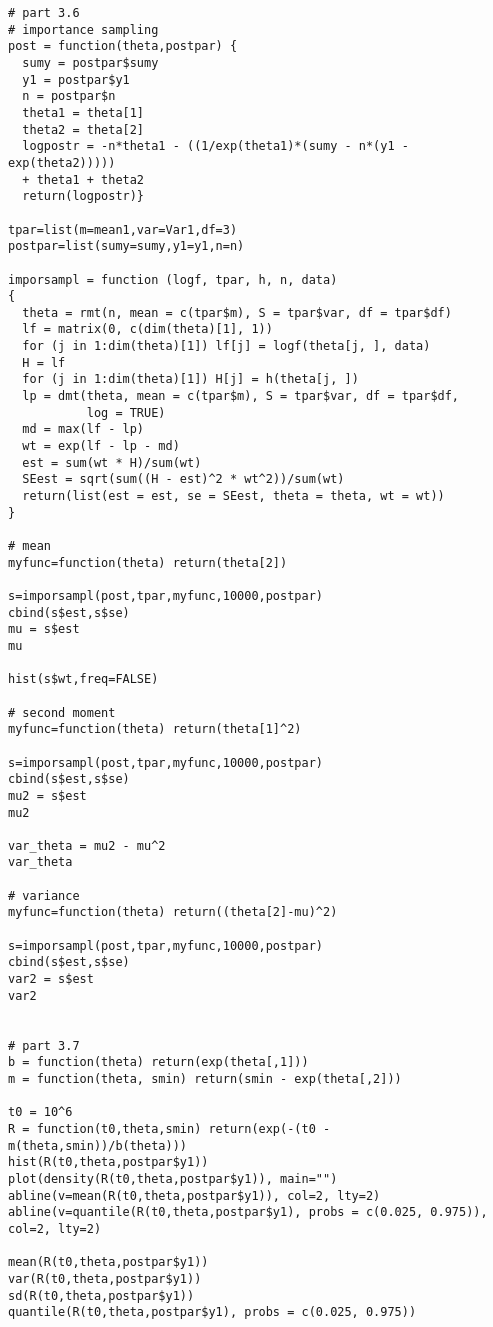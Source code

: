 \documentclass[a4paper, 11pt]{article}
\begin{document}
\begin{verbatim}
# part 3.6
# importance sampling
post = function(theta,postpar) {
  sumy = postpar$sumy
  y1 = postpar$y1
  n = postpar$n
  theta1 = theta[1]
  theta2 = theta[2]
  logpostr = -n*theta1 - ((1/exp(theta1)*(sumy - n*(y1 - exp(theta2))))) 
  + theta1 + theta2
  return(logpostr)} 

tpar=list(m=mean1,var=Var1,df=3)
postpar=list(sumy=sumy,y1=y1,n=n)

imporsampl = function (logf, tpar, h, n, data) 
{
  theta = rmt(n, mean = c(tpar$m), S = tpar$var, df = tpar$df)
  lf = matrix(0, c(dim(theta)[1], 1))
  for (j in 1:dim(theta)[1]) lf[j] = logf(theta[j, ], data)
  H = lf
  for (j in 1:dim(theta)[1]) H[j] = h(theta[j, ])
  lp = dmt(theta, mean = c(tpar$m), S = tpar$var, df = tpar$df, 
           log = TRUE)
  md = max(lf - lp)
  wt = exp(lf - lp - md)
  est = sum(wt * H)/sum(wt)
  SEest = sqrt(sum((H - est)^2 * wt^2))/sum(wt)
  return(list(est = est, se = SEest, theta = theta, wt = wt))
}

# mean
myfunc=function(theta) return(theta[2])

s=imporsampl(post,tpar,myfunc,10000,postpar)
cbind(s$est,s$se)
mu = s$est
mu

hist(s$wt,freq=FALSE)

# second moment
myfunc=function(theta) return(theta[1]^2)

s=imporsampl(post,tpar,myfunc,10000,postpar)
cbind(s$est,s$se)
mu2 = s$est
mu2

var_theta = mu2 - mu^2
var_theta

# variance
myfunc=function(theta) return((theta[2]-mu)^2)

s=imporsampl(post,tpar,myfunc,10000,postpar)
cbind(s$est,s$se)
var2 = s$est
var2


# part 3.7
b = function(theta) return(exp(theta[,1]))
m = function(theta, smin) return(smin - exp(theta[,2]))

t0 = 10^6
R = function(t0,theta,smin) return(exp(-(t0 - m(theta,smin))/b(theta)))
hist(R(t0,theta,postpar$y1))
plot(density(R(t0,theta,postpar$y1)), main="")
abline(v=mean(R(t0,theta,postpar$y1)), col=2, lty=2)
abline(v=quantile(R(t0,theta,postpar$y1), probs = c(0.025, 0.975)), col=2, lty=2)

mean(R(t0,theta,postpar$y1))
var(R(t0,theta,postpar$y1))
sd(R(t0,theta,postpar$y1))
quantile(R(t0,theta,postpar$y1), probs = c(0.025, 0.975))

\end{verbatim}
\end{document}
